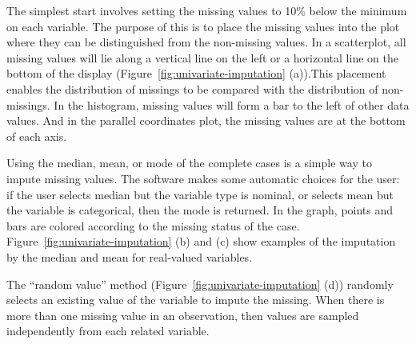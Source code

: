 \documentclass[article]{jss}
\begin{document}
The simplest start involves setting the missing values to 10\% below the minimum on each variable. The purpose of this is to place the missing values into the plot where they can be distinguished from the non-missing values. In a scatterplot, all missing values will lie along a vertical line on the left or a horizontal line on the bottom of the display (Figure~\ref{fig:univariate-imputation} (a)).This placement enables the distribution of missings to be compared with the distribution of non-missings. In the histogram, missing values will form a bar to the left of other data values. And in the parallel coordinates plot, the missing values are at the bottom of each axis. 

Using the median, mean, or mode of the complete cases is a simple way to impute missing values. The software makes some automatic choices for the user: if the user selects median but the variable type is nominal, or selects mean but the variable is categorical, then the mode is returned.  In the graph, points and bars are colored according to the missing status of the case. Figure~\ref{fig:univariate-imputation} (b) and (c) show examples of the imputation by the median and mean for real-valued variables.

The ``random value'' method (Figure~\ref{fig:univariate-imputation} (d)) randomly selects an existing value of the variable to impute the missing. When there is more than one missing value in an observation, then values are sampled independently from each related variable.
\end{document}
